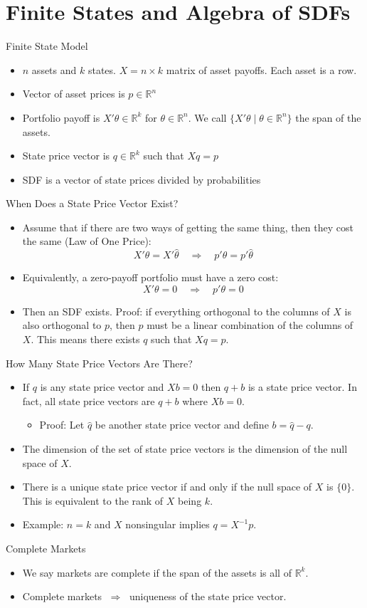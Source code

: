 \documentclass[10pt]{beamer}
\newcommand{\bi}{\begin{itemize}}
\newcommand{\ei}{\end{itemize}}
\newcommand{\im}{\item}
\newcommand{\myreal}{\ensuremath{\mathbb{R}}}
\begin{document}
\section{Finite States and Algebra of SDFs}

\begin{frame}{Finite State Model}
\bi 
\im
 $n$ assets and $k$ states.  $X = n \times k$ matrix of asset payoffs.  Each asset is a row.  
\im 
 Vector of asset prices is $p \in \myreal^n$
 \im 
 Portfolio payoff is $X'\theta \in \myreal^k$ for $\theta \in \myreal^n$.  We call $\{X'\theta \mid \theta \in \myreal^n\}$ the span of the assets.
\im 
State price vector is $q \in \myreal^k$ such that $Xq = p$
\im SDF is a vector of state prices divided by probabilities
\ei 
\end{frame}

\begin{frame}{When Does a State Price Vector Exist?}
  \bi \im Assume that if there are two ways of getting the same thing, then they cost the same (Law of One Price):
$$X'\theta = X'\hat{\theta}  \quad \Rightarrow \quad p'\theta = p'\hat{\theta}$$
\im Equivalently, a zero-payoff portfolio must have a zero cost:
$$X'\theta = 0  \quad \Rightarrow \quad p'\theta = 0$$
\im Then an SDF exists.  Proof: if everything orthogonal to the columns of $X$ is also orthogonal to $p$, then $p$ must be a linear combination of the columns of $X$.  This means there exists $q$ such that $Xq = p$.

\ei 
\end{frame}

\begin{frame}{How Many State Price Vectors Are There?}
    \bi
    \im If $q$ is any state price vector and $Xb = 0$ then $q+b$ is a state price vector.  In fact, all state price vectors are $q+b$ where $Xb=0$.  
    \bi 
    \im Proof: Let $\hat{q}$ be another state price vector and define $b=\hat{q} - q$.
    \ei
    \im The dimension of the set of state price vectors is the dimension of the null space of $X$.
    \im There is a unique state price vector if and only if the null space of $X$ is $\{0\}$.  This is equivalent to the rank of $X$ being $k$.
    \im Example: $n=k$ and $X$ nonsingular implies $q = X^{-1}p$.
    \ei 
\end{frame}

\begin{frame}{Complete Markets}
    \bi
    \im We say markets are complete if the span of the assets is all of $\myreal^k$.
    \im Complete markets $\;\Rightarrow\;$ uniqueness of the state price vector.
    \ei
\end{frame}
\end{document}
